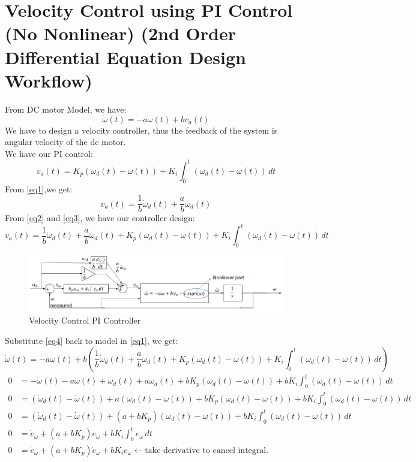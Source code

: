 \documentclass[12pt,a4paper]{article}
\begin{document}
	\section{Velocity Control using PI Control (No Nonlinear) (2nd Order Differential Equation Design Workflow)}
	From DC motor Model, we have:
	\begin{equation}
		\label{eq1}
		\dot{\omega}(t) = -a\omega(t) + bv_a(t) 	
	\end{equation}
	We have to design a velocity controller, thus the feedback of the system is angular velocity of the dc motor.\\
	We have our PI control:
	\begin{equation}
		\label{eq2}
		v_a(t) = K_p(\omega_d(t) - \omega(t)) + K_i \int_{0}^{t} (\omega_d(t) - \omega(t)) \,dt
	\end{equation}
	From \autoref{eq1},we get:
	\begin{equation}
		\label{eq3}
		v_a(t) = \frac{1}{b}\dot{\omega}_d(t) + \frac{a}{b}\omega_d(t)
	\end{equation}
	From \autoref{eq2} and \autoref{eq3}, we have our controller design:
	\begin{equation}
		\label{eq4}
		v_a(t) = \frac{1}{b}\dot{\omega}_d(t) + \frac{a}{b}\omega_d(t) + K_p(\omega_d(t) - \omega(t)) + K_i \int_{0}^{t} (\omega_d(t) - \omega(t)) \,dt
	\end{equation}
	\begin{figure}[ht]
		\centering
		\includegraphics[scale=0.9]{src/img/fig1.pdf}
		\caption{Velocity Control PI Controller}
		\label{fig:Velocity Control PI Controller}
	\end{figure}
	\break
	Substitute \autoref{eq4} back to model in \autoref{eq1}, we get:
	\begin{equation}
		\label{eq5}
		\dot{\omega}(t) = -a\omega(t) + b\left(\frac{1}{b}\dot{\omega}_d(t) + \frac{a}{b}\omega_d(t) + K_p(\omega_d(t) - \omega(t)) + K_i \int_{0}^{t} (\omega_d(t) - \omega(t)) \,dt\right)
	\end{equation}
	\[
	\begin{split}
		0 &= -\dot{\omega}(t) - a\omega(t) + \dot{\omega}_d(t) + a\omega_d(t) + bK_p(\omega_d(t) - \omega(t)) + bK_i \int_{0}^{t} (\omega_d(t) - \omega(t)) \,dt \\
		0 &= (\dot{\omega}_d(t) - \dot{\omega}(t)) + a(\omega_d(t) - \omega(t)) + bK_p(\omega_d(t) - \omega(t)) + bK_i \int_{0}^{t} (\omega_d(t) - \omega(t)) \,dt \\
		0 &= (\dot{\omega}_d(t) - \dot{\omega}(t)) + (a + bK_p)(\omega_d(t) - \omega(t)) + bK_i \int_{0}^{t} (\omega_d(t) - \omega(t)) \,dt \\
		0 &= \dot{e}_{\omega} + (a + bK_p)e_{\omega} + bK_i \int_{0}^{t} e_{\omega}\,dt \\
		0 &= \ddot{e}_{\omega} + (a + bK_p)\dot{e}_{\omega} + bK_ie_{\omega} \leftarrow \text{take derivative to cancel integral.}\\
	\end{split}
	\]
\end{document}
